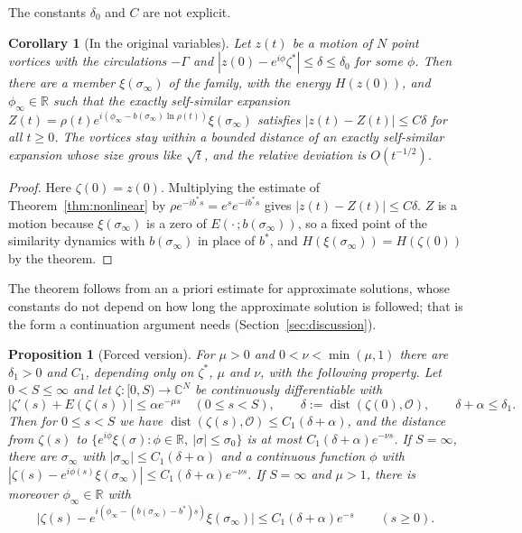 \documentclass[11pt]{article}
\newtheorem{corollary}{Corollary}
\newtheorem{proposition}{Proposition}
\theoremstyle{definition}
\newcommand{\C}{\mathbb{C}}
\newcommand{\R}{\mathbb{R}}
\begin{document}
The constants $\delta_0$ and $C$ are not explicit.

\begin{corollary}[In the original variables]\label{cor:physical}
Let $z(t)$ be a motion of $N$ point vortices with the circulations $-\Gamma$ and $|z(0) - e^{i\phi}\zeta^*| \le \delta \le \delta_0$ for some $\phi$. Then there are a member $\xi(\sigma_\infty)$ of the family, with the energy $H(z(0))$, and $\phi_\infty \in \R$ such that the exactly self-similar expansion $Z(t) = \rho(t)e^{i(\phi_\infty - b(\sigma_\infty)\ln\rho(t))}\xi(\sigma_\infty)$ satisfies $|z(t) - Z(t)| \le C\delta$ for all $t \ge 0$. The vortices stay within a bounded distance of an exactly self-similar expansion whose size grows like $\sqrt t$, and the relative deviation is $O(t^{-1/2})$.
\end{corollary}

\begin{proof}
Here $\zeta(0) = z(0)$. Multiplying the estimate of Theorem~\ref{thm:nonlinear} by $\rho e^{-ib^*s} = e^{s}e^{-ib^*s}$ gives $|z(t) - Z(t)|\le C\delta$. $Z$ is a motion because $\xi(\sigma_\infty)$ is a zero of $E(\cdot\,; b(\sigma_\infty))$, so a fixed point of the similarity dynamics with $b(\sigma_\infty)$ in place of $b^*$, and $H(\xi(\sigma_\infty)) = H(\zeta(0))$ by the theorem.
\end{proof}

The theorem follows from an a priori estimate for approximate solutions, whose constants do not depend on how long the approximate solution is followed; that is the form a continuation argument needs (Section~\ref{sec:discussion}).

\begin{proposition}[Forced version]\label{prop:forced}
For $\mu > 0$ and $0 < \nu < \min(\mu, 1)$ there are $\delta_1 > 0$ and $C_1$, depending only on $\zeta^*$, $\mu$ and $\nu$, with the following property. Let $0 < S \le \infty$ and let $\zeta: [0, S) \to \C^N$ be continuously differentiable with
\[
  \bigl|\zeta'(s) + E(\zeta(s))\bigr| \le \alpha e^{-\mu s}\quad(0 \le s < S),\qquad \delta := \operatorname{dist}(\zeta(0), \mathcal O),\qquad \delta + \alpha \le \delta_1.
\]
Then for $0 \le s < S$ we have $\operatorname{dist}(\zeta(s), \mathcal O) \le C_1(\delta + \alpha)$, and the distance from $\zeta(s)$ to $\{e^{i\phi}\xi(\sigma): \phi \in \R,\ |\sigma| \le \sigma_0\}$ is at most $C_1(\delta + \alpha)e^{-\nu s}$. If $S = \infty$, there are $\sigma_\infty$ with $|\sigma_\infty| \le C_1(\delta + \alpha)$ and a continuous function $\phi$ with $|\zeta(s) - e^{i\phi(s)}\xi(\sigma_\infty)| \le C_1(\delta + \alpha)e^{-\nu s}$. If $S = \infty$ and $\mu > 1$, there is moreover $\phi_\infty \in \R$ with
\[
  \bigl|\zeta(s) - e^{i(\phi_\infty - (b(\sigma_\infty) - b^*)s)}\xi(\sigma_\infty)\bigr| \le C_1(\delta + \alpha)e^{-s}\qquad(s \ge 0).
\]
\end{proposition}
\end{document}
